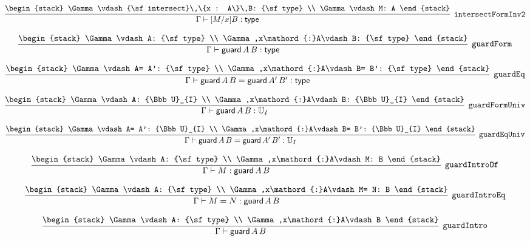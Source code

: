 \[
\infer[{\tt intersectFormInv2}]{\Gamma \vdash [M/x]B: {\sf type}}{
\begin{stack}
\Gamma \vdash {\sf intersect}\,\{x : A\}\,B: {\sf type}
\\
\Gamma \vdash M: A
\end{stack}}
\]

\[
\infer[{\tt guardForm}]{\Gamma \vdash {\sf guard}\,A\,B: {\sf type}}{
\begin{stack}
\Gamma \vdash A: {\sf type}
\\
\Gamma ,x\mathord{:}A\vdash B: {\sf type}
\end{stack}}
\]

\[
\infer[{\tt guardEq}]{\Gamma \vdash {\sf guard}\,A\,B= {\sf guard}\,A'\,B': {\sf type}}{
\begin{stack}
\Gamma \vdash A= A': {\sf type}
\\
\Gamma ,x\mathord{:}A\vdash B= B': {\sf type}
\end{stack}}
\]

\[
\infer[{\tt guardFormUniv}]{\Gamma \vdash {\sf guard}\,A\,B: {\Bbb U}_{I}}{
\begin{stack}
\Gamma \vdash A: {\Bbb U}_{I}
\\
\Gamma ,x\mathord{:}A\vdash B: {\Bbb U}_{I}
\end{stack}}
\]

\[
\infer[{\tt guardEqUniv}]{\Gamma \vdash {\sf guard}\,A\,B= {\sf guard}\,A'\,B': {\Bbb U}_{I}}{
\begin{stack}
\Gamma \vdash A= A': {\Bbb U}_{I}
\\
\Gamma ,x\mathord{:}A\vdash B= B': {\Bbb U}_{I}
\end{stack}}
\]

\[
\infer[{\tt guardIntroOf}]{\Gamma \vdash M: {\sf guard}\,A\,B}{
\begin{stack}
\Gamma \vdash A: {\sf type}
\\
\Gamma ,x\mathord{:}A\vdash M: B
\end{stack}}
\]

\[
\infer[{\tt guardIntroEq}]{\Gamma \vdash M= N: {\sf guard}\,A\,B}{
\begin{stack}
\Gamma \vdash A: {\sf type}
\\
\Gamma ,x\mathord{:}A\vdash M= N: B
\end{stack}}
\]

\[
\infer[{\tt guardIntro}]{\Gamma \vdash {\sf guard}\,A\,B}{
\begin{stack}
\Gamma \vdash A: {\sf type}
\\
\Gamma ,x\mathord{:}A\vdash B
\end{stack}}
\]

